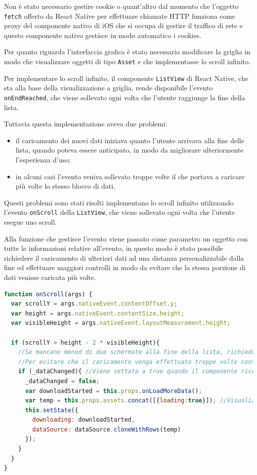 Non è stato necessario gestire cookie o quant'altro dal momento che l'oggetto \texttt{fetch} offerto da React Native per effettuare chiamate HTTP funziona come proxy del componente nativo di iOS che si occupa di gestire il traffico di rete e questo componente nativo gestisce in modo automatico i cookies.

Per quanto riguarda l'interfaccia grafica è stato necessario modificare la griglia in modo che visualizzare oggetti di tipo \texttt{Asset} e che implementasse lo scroll infinito.

Per implementare lo scroll infinito, il componente \texttt{ListView} di React Native, che sta alla base della visualizzazione a griglia, rende disponibile l'evento \texttt{onEndReached}, che viene sollevato ogni volta che l'utente raggiunge la fine della lista.

Tuttavia questa implementazione aveva due problemi:
\begin{itemize}
\item il caricamento dei nuovi dati iniziava quanto l'utente arrivava alla fine delle lista, quando poteva essere anticipato, in modo da migliorare ulteriormente l'esperienza d'uso;
\item in alcuni casi l'evento veniva sollevato troppe volte il che portava a caricare più volte lo stesso blocco di dati.
\end{itemize}

Questi problemi sono stati risolti implementano lo scroll infinito utilizzando l'evento \texttt{onScroll} della \texttt{ListView}, che viene sollevato ogni volta che l'utente esegue uno scroll.

Alla funzione che gestisce l'evento viene passato come parametro un oggetto con tutte le informazioni relative all'evento, in questo modo è stato possibile richiedere il caricamento di ulteriori dati ad una distanza personalizzabile dalla fine ed effettuare maggiori controlli in modo da evitare che la stessa porzione di dati venisse caricata più volte.

\begin{lstlisting}[language=JavaScript, caption=Funzione che gestisce l'evento onScroll della griglia che visualizza gli assets]
function onScroll(args) {
  var scrollY = args.nativeEvent.contentOffset.y;
  var height = args.nativeEvent.contentSize.height;
  var visibleHeight = args.nativeEvent.layoutMeasurement.height;

  if (scrollY > height - 2 * visibleHeight){
    //Se mancano menod di due schermate alla fine della lista, richiedo il caricamento di ulteriori dati
    //Per evitare che il caricamento venga effettuato troppe volte controllo che i dati siano cambiati rispetto all'ultima volta che ho effettuato il caricamento.
    if (_dataChanged){ //Viene settata a true quando il componente riceve dei dati nuovi
      _dataChanged = false;
      var downloadStarted = this.props.onLoadMoreData();
      var temp = this.props.assets.concat([{loading:true}]); //Visualizza un'indicatore di caricamento
      this.setState({
        downloading: downloadStarted,
        dataSource: dataSource.cloneWithRows(temp)
      });
    }
  }
}
\end{lstlisting}

